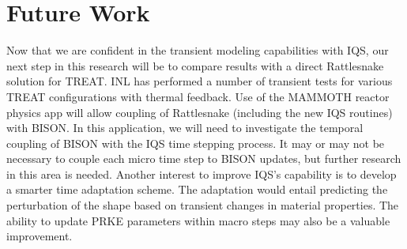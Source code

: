 \documentclass[12pt]{scrartcl}
\begin{document}
\section{Future Work}

Now that we are confident in the transient modeling capabilities with IQS, our next step in this research will be to compare results with a direct Rattlesnake solution for TREAT.  INL has performed a number of transient tests for various TREAT configurations with thermal feedback.  Use of the MAMMOTH reactor physics app will allow coupling of Rattlesnake (including the new IQS routines) with BISON.  In this application, we will need to investigate the temporal coupling of BISON with the IQS time stepping process.  It may or may not be necessary to couple each micro time step to BISON updates, but further research in this area is needed.  Another interest to improve IQS's capability is to develop a smarter time adaptation scheme.  The adaptation would entail predicting the perturbation of the shape based on transient changes in material properties.  The ability to update PRKE parameters within macro steps may also be a valuable improvement.


\clearpage
\pagebreak
\newpage


\appendix
\end{document}
